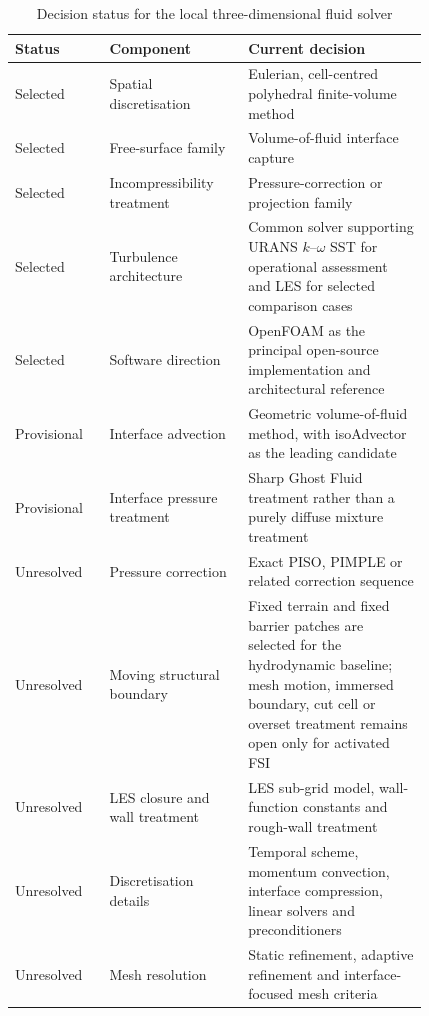 \begin{table}[htbp]
  \centering
  \small
  \renewcommand{\arraystretch}{1.2}
  \caption{Decision status for the local three-dimensional fluid solver}
  \label{tab:num-local-three-dimensional-decision-status}
  \begin{tabular}{
      p{0.17\linewidth}
      p{0.28\linewidth}
      p{0.37\linewidth}
    }
    \hline
    Status
    &
    Component
    &
    Current decision
    \\
    \hline
    Selected
    &
    Spatial discretisation
    &
    Eulerian, cell-centred polyhedral finite-volume method
    \\
    Selected
    &
    Free-surface family
    &
    Volume-of-fluid interface capture
    \\
    Selected
    &
    Incompressibility treatment
    &
    Pressure-correction or projection family
    \\
    Selected
    &
    Turbulence architecture
    &
    Common solver supporting URANS $k$--$\omega$ SST for operational
    assessment and LES for selected comparison cases
    \\
    Selected
    &
    Software direction
    &
    OpenFOAM as the principal open-source implementation and
    architectural reference
    \\
    Provisional
    &
    Interface advection
    &
    Geometric volume-of-fluid method, with isoAdvector as the leading
    candidate
    \\
    Provisional
    &
    Interface pressure treatment
    &
    Sharp Ghost Fluid treatment rather than a purely diffuse mixture
    treatment
    \\
    Unresolved
    &
    Pressure correction
    &
    Exact PISO, PIMPLE or related correction sequence
    \\
    Unresolved
    &
    Moving structural boundary
    &
    Fixed terrain and fixed barrier patches are selected for the
    hydrodynamic baseline; mesh motion, immersed boundary, cut cell or
    overset treatment remains open only for activated FSI
    \\
    Unresolved
    &
    LES closure and wall treatment
    &
    LES sub-grid model, wall-function constants and rough-wall
    treatment
    \\
    Unresolved
    &
    Discretisation details
    &
    Temporal scheme, momentum convection, interface compression, linear
    solvers and preconditioners
    \\
    Unresolved
    &
    Mesh resolution
    &
    Static refinement, adaptive refinement and interface-focused mesh
    criteria
    \\
    \hline
  \end{tabular}
\end{table}

